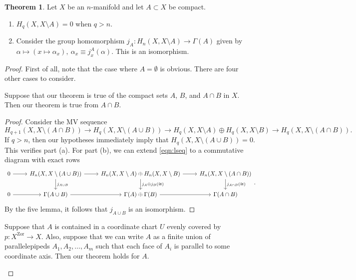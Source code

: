 \documentclass[10pt,letterpaper,cm]{nupset}
\theoremstyle{definition}
\theoremstyle{theorem}
\newtheorem{theorem}[definition]{Theorem}
\theoremstyle{remark}
\newcommand{\1}{\mathbb{1}}
\newcommand{\0}{\vec 0}
\begin{document}
\begin{theorem}
Let $X$ be an $n$-manifold and let $A \subset X$ be compact.
\begin{enumerate}[label=(\alph*)]
\item $H_q(X, X \setminus A) =0$ when $q>n$.
\item Consider the group homomorphism $j_A : H_n(X, X \setminus A) \to \Gamma(A)$ given by $\alpha \mapsto \left(x \mapsto \alpha_x\right), \ \alpha_x \equiv j_x^A(\alpha)$. This is an isomorphism.
\end{enumerate}
\end{theorem}
\begin{proof}  First of all, note that the case where $A = \emptyset$ is obvious. There are four other cases to consider. 
\begin{steps}
\item Suppose that our theorem is true of the compact sets $A$, $B$, and $A \cap B$ in $X$. Then our theorem is true from $A \cap B$.
\begin{proof}
Consider the MV sequence
\[ \label{eqn:lseq}
{H_{q+1}(X, X \setminus (A \cap B))} \to  {H_q(X, X \setminus (A \cup B))} \to {H_q(X, X \setminus A)\oplus H_q(X, X \setminus B)} \to {H_q(X, X \setminus (A \cap B))}
.\tag{$\star$}\] If $ q>n$, then our hypotheses immediately imply that $H_q(X, X \setminus (A \cup B)) =0$. This verifies part (a). For part (b), we can extend \eqref{eqn:lseq} to a commutative diagram with exact rows
\[
\begin{tikzcd}
0 \arrow[r] & {H_n(X, X \setminus (A \cup B))} \arrow[r] \arrow[d, "j_{A\cup B}"] & {H_n(X, X \setminus A)\oplus H_n(X, X \setminus B)} \arrow[r] \arrow[d, "j_A \oplus j_B(\cong)"] & {H_n(X, X \setminus (A \cap B))} \arrow[d, "j_{A\cap B}(\cong)"] \\
0 \arrow[r] & \Gamma(A \cup B) \arrow[r]                                        & \Gamma(A) \oplus \Gamma(B) \arrow[r]                                                             & \Gamma(A \cap B)                                              
\end{tikzcd}
.\] By the five lemma, it follows that $j_{A\cup B}$ is an isomorphism. 
\end{proof}
\item Suppose that $A$ is contained in a coordinate chart $U$ evenly covered by $p: X^{\mathrm{Zor}} \to X$. Also, suppose that we can write $A$ as a finite union of parallelepipeds $A_1, A_2, \ldots, A_m$ such that each face  of $A_i$ is parallel to some coordinate axis. Then our theorem holds for $A$.

\end{steps}
\end{proof}
\end{document}
